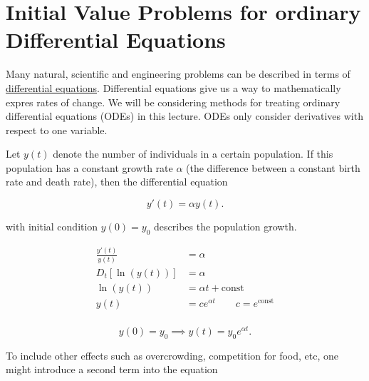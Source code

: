 \section{Initial Value Problems for ordinary Differential Equations}

Many natural, scientific and engineering problems can be described in terms of 
\uline{differential equations}. Differential equations give us a way to
mathematically expres rates of change. We will be considering methods for
treating ordinary differential equations (ODEs) in this lecture. ODEs only
consider derivatives with respect to one variable.

\Ex Let $y(t)$ denote the number of individuals in a certain population. If this
population has a constant growth rate $\alpha$ (the difference between a
constant birth rate and death rate), then the differential equation 

\[
y'(t) = \alpha y(t)
.\]

with initial condition $y(0) = y_0$ describes the population growth.

\soln 


\begin{align*}
  \frac{y'(t)}{y(t)} &= \alpha \\
  D_t[\ln(y(t))] &= \alpha \\
  \ln(y(t)) &= \alpha t + \text{const}  \\
  y(t) &= ce^{\alpha t} \qquad c = e^{\text{const}}\\
\end{align*}

\begin{equation*}
  y(0) = y_0 \implies y(t) = y_0 e^{\alpha t}
.\end{equation*}

To include other effects such as overcrowding, competition for food, etc, one
might introduce a second term into the equation


